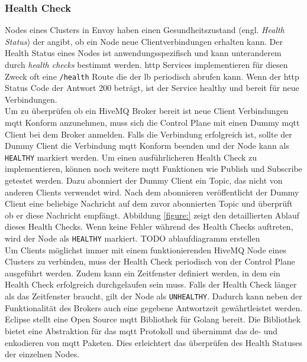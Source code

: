 \subsubsection{Health Check} \label{ss:health-check}
Nodes eines Clusters in Envoy haben einen Gesundheitszustand (engl. \textit{Health Status}) der angibt, ob ein Node neue Clientverbindungen erhalten kann.
Der Health Status eines Nodes ist anwendungsspezifisch und kann unteranderem durch \textit{health checks} bestimmt werden.
\ac{http} Services implementieren für diesen Zweck oft eine \verb|/health| Route die der \acl{lb} periodisch abrufen kann. Wenn der \ac{http} Status Code der Antwort 200 beträgt, ist der Service healthy und bereit für neue Verbindungen.
\\
Um zu überprüfen ob ein HiveMQ Broker bereit ist neue Client Verbindungen \ac{mqtt} Konform anzunehmen, muss sich die Control Plane mit einen Dummy \ac{mqtt} Client bei dem Broker anmelden. Falls die Verbindung erfolgreich ist, sollte der Dummy Client die Verbindung \ac{mqtt} Konform beenden und der Node kann als \verb|HEALTHY| markiert werden.
Um einen ausführlicheren Health Check zu implementieren, können noch weitere \ac{mqtt} Funktionen wie Publish und Subscribe getestet werden. Dazu abonniert der Dummy Client ein Topic, das nicht von anderen Clients verwendet wird. Nach dem abonnieren veröffentlicht der Dummy Client eine beliebige Nachricht auf dem zuvor abonnierten Topic und überprüft ob er diese Nachricht empfängt. Abbildung \ref{figure:} zeigt den detaillierten Ablauf dieses Health Checks. Wenn keine Fehler während des Health Checks auftreten, wird der Node als \verb|HEALTHY| markiert.
TODO ablaufdiagramm erstellen
\\
Um Clients möglichst immer mit einem funktionierenden HiveMQ Node eines Clusters zu verbinden, muss der Health Check periodisch von der Control Plane ausgeführt werden.
Zudem kann ein Zeitfenster definiert werden, in dem ein Health Check erfolgreich durchgelaufen sein muss. Falls der Health Check länger als das Zeitfenster braucht, gilt der Node als \verb|UNHEALTHY|. Dadurch kann neben der Funktionalität des Brokers auch eine gegebene Antwortzeit gewährtleistet werden.
\\
Eclipse stellt eine Open Source \ac{mqtt} Bibliothek für Golang bereit.
Die Bibliothek bietet eine Abstraktion für das \ac{mqtt} Protokoll und übernimmt das de- und enkodieren von \ac{mqtt} Paketen. Dies erleichtert das überprüfen des Health Statuses der einzelnen Nodes.
